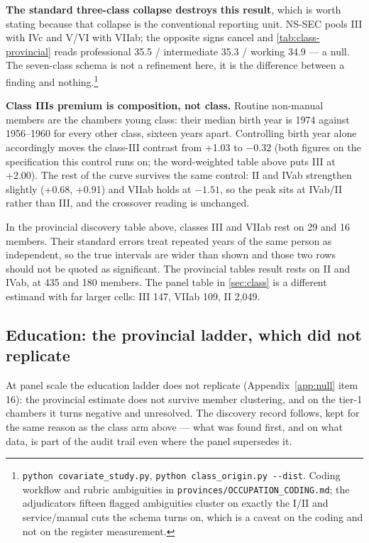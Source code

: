 \textbf{The standard three-class collapse destroys this result}, which is worth
stating because that collapse is the conventional reporting unit. NS-SEC pools
III with IVc and V/VI with VIIab; the opposite signs cancel and \cref{tab:class-provincial} reads professional 35.5 / intermediate 35.3 / working 34.9 --- a null. The
seven-class schema is not a refinement here, it is the difference between a
finding and nothing.\footnote{\texttt{python\ covariate\_\allowbreak{}study.\allowbreak{}py}, \texttt{python\ class\_\allowbreak{}origin.\allowbreak{}py\ -\allowbreak{}\/\allowbreak{}-\allowbreak{}dist}. Coding
  workflow and rubric ambiguities in \texttt{provinces/\allowbreak{}OCCUPATION\_\allowbreak{}CODING.\allowbreak{}md}; the
  adjudicators\textquotesingle{} fifteen flagged ambiguities cluster on exactly the I/II and
  service/manual cuts the schema turns on, which is a caveat on the coding
  and not on the register measurement.}

\textbf{Class III\textquotesingle s premium is composition, not class.} Routine non-manual members
are the chamber\textquotesingle s young class: their median birth year is 1974 against
1956--1960 for every other class, sixteen years apart. Controlling birth year
alone accordingly moves the class-III contrast from +1.03 to \(-0.32\) (both
figures on the specification this control runs on; the word-weighted table
above puts III at +2.00). The rest of the curve survives the same control: II
and IVab strengthen slightly (+0.68, +0.91) and VIIab holds at \(-1.51\), so the
peak sits at IVab/II rather than III, and the crossover reading is
unchanged.

In the provincial discovery table above, classes III and VIIab rest on
29 and 16 members. Their standard errors treat repeated years of the same
person as independent, so the true intervals are wider than shown and those
two rows should not be quoted as significant. The provincial table\textquotesingle s result
rests on II and IVab, at 435 and 180 members. The panel table in \cref{sec:class} is a
different estimand with far larger cells: III 147, VIIab 109, II 2,049.

\subsection{Education: the provincial ladder, which did not replicate}\label{sub:education-provincial}

At panel scale the education ladder does not replicate (Appendix~\ref{app:null} item 16):
the provincial estimate does not survive member clustering, and on the tier-1
chambers it turns negative and unresolved. The discovery record follows, kept
for the same reason as the class arm above --- what was found first, and on what
data, is part of the audit trail even where the panel supersedes it.

